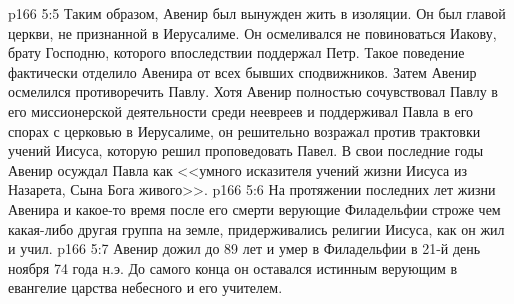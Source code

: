 \vs p166 5:5 Таким образом, Авенир был вынужден жить в изоляции. Он был главой церкви, не признанной в Иерусалиме. Он осмеливался не повиноваться Иакову, брату Господню, которого впоследствии поддержал Петр. Такое поведение фактически отделило Авенира от всех бывших сподвижников. Затем Авенир осмелился противоречить Павлу. Хотя Авенир полностью сочувствовал Павлу в его миссионерской деятельности среди неевреев и поддерживал Павла в его спорах с церковью в Иерусалиме, он решительно возражал против трактовки учений Иисуса, которую решил проповедовать Павел. В свои последние годы Авенир осуждал Павла как <<умного исказителя учений жизни Иисуса из Назарета, Сына Бога живого>>.
\vs p166 5:6 На протяжении последних лет жизни Авенира и какое\hyp{}то время после его смерти верующие Филадельфии строже чем какая\hyp{}либо другая группа на земле, придерживались религии Иисуса, как он жил и учил.
\vs p166 5:7 Авенир дожил до 89 лет и умер в Филадельфии в 21\hyp{}й день ноября 74 года н.э. До самого конца он оставался истинным верующим в евангелие царства небесного и его учителем.
